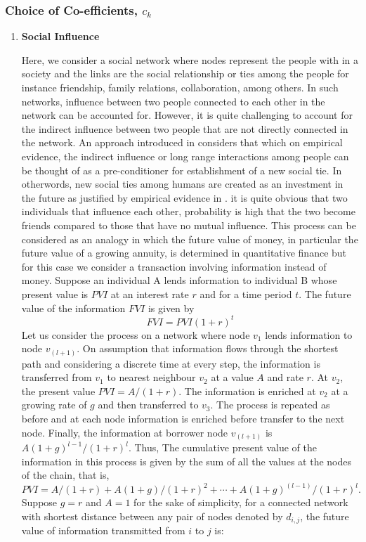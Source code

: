 \documentclass[10pt,a4paper]{article}
\theoremstyle{plain}
\theoremstyle{definition}
\begin{document}
        \subsubsection{Choice of Co-efficients, $c_k$}
        \begin{enumerate}[1)]
        	\item \textbf{Social Influence }
        	  	
    	    	Here, we consider a social network where nodes represent the people with in a society and the links are the social relationship or ties among the people for instance friendship, family relations, collaboration, among others. In such networks, influence between two people connected to each other in the network can be accounted for. However, it is quite challenging to account for the indirect influence between two people that are not directly connected in the network. An approach introduced in \citep{estrada2011epidemic}considers that which on empirical evidence, the indirect influence or long range interactions among people can be thought of as a pre-conditioner for establishment of a new social tie. In otherwords, new social ties among humans are created as an investment in the future as justified by empirical evidence in \citep{estrada2011epidemic}. it is quite obvious that two individuals that influence each other, probability is high that the two become friends compared to those that have no mutual influence. This process can be considered as an analogy in which the future value of money, in particular the future value of a growing annuity, is determined in quantitative finance but for this case we consider a transaction involving information instead of money. Suppose an individual A lends information to individual B whose present value is $PVI$ at an interest rate $r$ and for a time period $t$. The future value of the information $FVI$ is given by
    	    	\begin{equation}
    	    	FVI = PVI (1+r)^t
    	    	\end{equation}
    	    	Let us consider the process on a network where node $v_1$ lends information to node $v_(l+1)$. On assumption that information flows through the shortest path and considering a discrete time at every step, the information is transferred from $v_1$ to nearest neighbour $v_2$ at a value $A$ and rate $r$. At $v_2$, the present value $PVI=A/(1+r)$. The information is enriched at $v_2$ at a growing rate of $g$ and then transferred to $v_3$. The process is repeated as before and at each node information is enriched before transfer to the next node. Finally, the information at borrower node $v_(l+1)$ is $A ( 1 + g )^ {l -1} /( 1 + r )^l$. Thus, The cumulative present
    	    	value of the information in this process is given by the sum of all the values at the nodes of the chain, that is,
    	    	\begin{equation}
    	    	PVI
    	    	= A /( 1 + r ) + A ( 1 + g )/( 1 + r )^2 + \cdots + A ( 1 + g )^(l -1) /( 1 + r )^l .
    	    	\end{equation}
    	    	Suppose $g=r$ and $A=1$ for the sake of simplicity, for a connected network with shortest distance between any pair of nodes denoted by $d_{i,j}$, the future value of information transmitted from $i$ to $j$ is:
    	    	

\end{enumerate}
\end{document}
